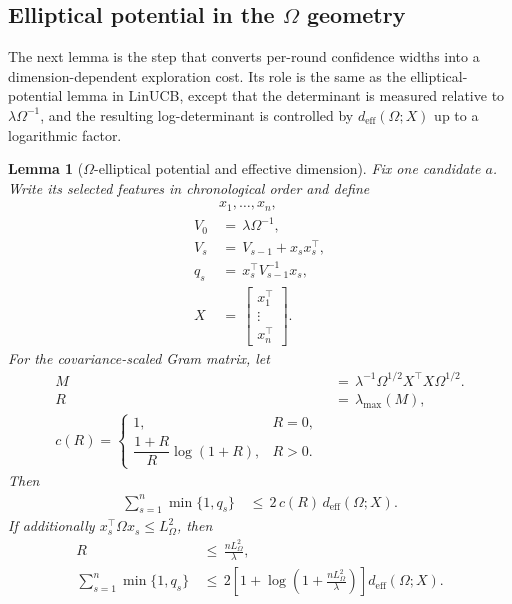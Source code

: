 \documentclass{article} %
\newtheorem{lemma}[theorem]{Lemma}
\begin{document}
\subsection{Elliptical potential in the \(\Omega\) geometry}

The next lemma is the step that converts per-round confidence widths into a dimension-dependent exploration cost.  Its role is the same as the elliptical-potential lemma in LinUCB, except that the determinant is measured relative to \(\lambda\Omega^{-1}\), and the resulting log-determinant is controlled by \(d_{\mathrm{eff}}(\Omega;X)\) up to a logarithmic factor.

\begin{lemma}[\(\Omega\)-elliptical potential and effective dimension]
\label{lem:hyper-elliptical}
Fix one candidate \(a\). Write its selected features in chronological order
and define
\begin{align}
&x_1,\ldots,x_n,
\label{eq:hyper-elliptical-features}
\\
V_0
&\,=\,
\lambda\Omega^{-1},
\label{eq:hyper-elliptical-V0}
\\
V_s
&\,=\,
V_{s-1}+x_sx_s^\top,
\label{eq:hyper-elliptical-Vs}
\\
q_s
&\,=\,
x_s^\top V_{s-1}^{-1}x_s,
\label{eq:hyper-elliptical-qs}
\\
X
&\,=\,
\begin{bmatrix}
x_1^\top\\
\vdots\\
x_n^\top
\end{bmatrix}.
\label{eq:hyper-elliptical-X}
\end{align}
For the covariance-scaled Gram matrix, let
\begin{align}
M
&\,=\,
\lambda^{-1}\Omega^{1/2}X^\top X\Omega^{1/2}.
\label{eq:hyper-elliptical-M}
\\
R
&\,=\,
\lambda_{\max}(M),
\label{eq:hyper-elliptical-R}
\\
c(R)=
\begin{cases}
1, & R=0,\\[2mm]
\dfrac{1+R}{R}\log(1+R), & R>0 .
\end{cases}
\label{eq:hyper-elliptical-cR}
\end{align}
Then
\begin{equation}
\label{eq:hyper-elliptical-main}
\begin{aligned}
\sum_{s=1}^n \min\{1,q_s\}
&\,\leq\,
2\,c(R)\,d_{\mathrm{eff}}(\Omega;X).
\end{aligned}
\end{equation}
If additionally \(x_s^\top\Omega x_s\le L_{\Omega}^2\), then
\begin{align}
R
&\,\leq\,
\frac{nL_{\Omega}^2}{\lambda},
\label{eq:hyper-elliptical-radius}
\\
\sum_{s=1}^n \min\{1,q_s\}
&\,\leq\,
2
\left[
1+
\log\!\left(1+\frac{nL_{\Omega}^2}{\lambda}\right)
\right]
d_{\mathrm{eff}}(\Omega;X).
\label{eq:hyper-elliptical-logT}
\end{align}
\end{lemma}
\end{document}
